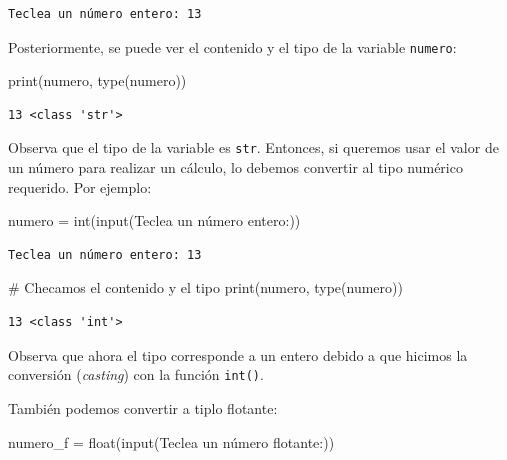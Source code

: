 \documentclass[
  spanish,
  letterpaper,
]{scrbook}
\newenvironment{Shaded}{\begin{snugshade}}{\end{snugshade}}
\newcommand{\BuiltInTok}[1]{\textcolor[rgb]{0.00,0.23,0.31}{#1}}
\newcommand{\CommentTok}[1]{\textcolor[rgb]{0.37,0.37,0.37}{#1}}
\newcommand{\NormalTok}[1]{\textcolor[rgb]{0.00,0.23,0.31}{#1}}
\newcommand{\OperatorTok}[1]{\textcolor[rgb]{0.37,0.37,0.37}{#1}}
\newcommand{\StringTok}[1]{\textcolor[rgb]{0.13,0.47,0.30}{#1}}
\theoremstyle{definition}
\theoremstyle{remark}
\begin{document}
\begin{verbatim}
Teclea un número entero: 13
\end{verbatim}

Posteriormente, se puede ver el contenido y el tipo de la variable
\texttt{numero}:

\begin{Shaded}
\begin{Highlighting}[]
\BuiltInTok{print}\NormalTok{(numero, }\BuiltInTok{type}\NormalTok{(numero)) }
\end{Highlighting}
\end{Shaded}

\begin{verbatim}
13 <class 'str'>
\end{verbatim}

Observa que el tipo de la variable es \texttt{str}. Entonces, si
queremos usar el valor de un número para realizar un cálculo, lo debemos
convertir al tipo numérico requerido. Por ejemplo:

\begin{Shaded}
\begin{Highlighting}[]
\NormalTok{numero }\OperatorTok{=} \BuiltInTok{int}\NormalTok{(}\BuiltInTok{input}\NormalTok{(}\StringTok{\textquotesingle{}Teclea un número entero:\textquotesingle{}}\NormalTok{))}
\end{Highlighting}
\end{Shaded}

\begin{verbatim}
Teclea un número entero: 13
\end{verbatim}

\begin{Shaded}
\begin{Highlighting}[]
\CommentTok{\# Checamos el contenido y el tipo}
\BuiltInTok{print}\NormalTok{(numero, }\BuiltInTok{type}\NormalTok{(numero)) }
\end{Highlighting}
\end{Shaded}

\begin{verbatim}
13 <class 'int'>
\end{verbatim}

Observa que ahora el tipo corresponde a un entero debido a que hicimos
la conversión (\emph{casting}) con la función \texttt{int()}.

También podemos convertir a tiplo flotante:

\begin{Shaded}
\begin{Highlighting}[]
\NormalTok{numero\_f }\OperatorTok{=} \BuiltInTok{float}\NormalTok{(}\BuiltInTok{input}\NormalTok{(}\StringTok{\textquotesingle{}Teclea un número flotante:\textquotesingle{}}\NormalTok{))}
\end{Highlighting}
\end{Shaded}
\end{document}
